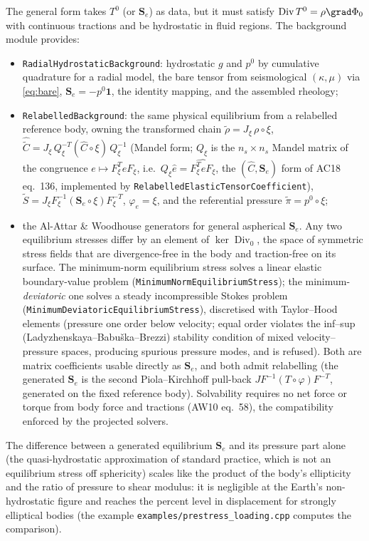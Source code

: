 \documentclass[11pt]{article}
\numberwithin{equation}{section}
\theoremstyle{remark}
\newcommand{\Div}{\operatorname{Div}}
\newcommand{\Ch}{\hat{C}}
\newcommand{\Se}{\mathbf{S}_e}
\newcommand{\code}[1]{\texttt{#1}}
\begin{document}
The general form takes $T^0$ (or $\Se$) as data, but it must satisfy
$\Div T^0 = \rho\grad\Phi_0$ with continuous tractions and be hydrostatic
in fluid regions. The background module provides:
\begin{itemize}
\item \code{RadialHydrostaticBackground}: hydrostatic $g$ and $p^0$ by
  cumulative quadrature for a radial model, the bare tensor from
  seismological $(\kappa,\mu)$ via \eqref{eq:bare}, $\Se = -p^0\mathbf{1}$,
  the identity mapping, and the assembled rheology;
\item \code{RelabelledBackground}: the same physical equilibrium from a
  relabelled reference body, owning the transformed chain
  $\tilde\rho = J_\xi\,\rho\circ\xi$,
  $\hat{\tilde C} = J_\xi\,Q_\xi^{-T}(\hat C\circ\xi)\,Q_\xi^{-1}$ (Mandel
  form; $Q_\xi$ is the $n_s\times n_s$ Mandel matrix of the congruence
  $e\mapsto F_\xi^TeF_\xi$, i.e.\ $Q_\xi\hat e = \widehat{F_\xi^TeF_\xi}$, the
  $(\Ch,\Se)$ form of AC18 eq.~136, implemented by
  \code{RelabelledElasticTensorCoefficient}),
  $\tilde S = J_\xi F_\xi^{-1}(\Se\circ\xi)F_\xi^{-T}$, $\varphi_e = \xi$,
  and the referential pressure $\tilde\pi = p^0\circ\xi$;
\item the Al-Attar \& Woodhouse \cite{AW10} generators for general
  aspherical $\Se$. Any two equilibrium stresses differ by an element of
  $\ker\Div_0$, the space of symmetric stress fields that are
  divergence-free in the body and traction-free on its surface. The minimum-norm
  equilibrium stress solves a linear elastic boundary-value problem
  (\code{MinimumNormEquilibriumStress}); the minimum-\emph{deviatoric} one
  solves a steady incompressible Stokes problem
  (\code{MinimumDeviatoricEquilibriumStress}), discretised with
  Taylor--Hood elements (pressure one order below velocity; equal order
  violates the inf--sup (Ladyzhenskaya--Babu\v{s}ka--Brezzi) stability
  condition of mixed velocity--pressure spaces, producing spurious pressure
  modes, and is refused). Both are matrix
  coefficients usable directly as $\Se$, and both admit relabelling (the
  generated $\Se$ is the second Piola--Kirchhoff pull-back
  $J F^{-1}(T\circ\varphi)F^{-T}$, generated on the fixed reference body).
  Solvability requires no net force or torque from body force and tractions
  (AW10 eq.~58), the compatibility enforced by the projected solvers.
\end{itemize}
The difference between a generated equilibrium $\Se$ and its pressure
part alone (the quasi-hydrostatic approximation of standard practice,
which is not an equilibrium stress off sphericity) scales like the product
of the body's ellipticity and the ratio of pressure to shear modulus: it is
negligible at the Earth's non-hydrostatic figure and reaches the percent
level in displacement for strongly elliptical bodies (the example
\code{examples/prestress\_loading.cpp} computes the comparison).
\end{document}
